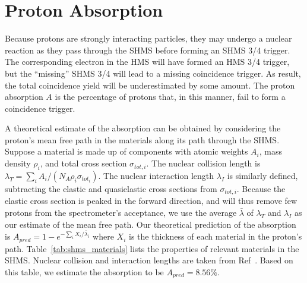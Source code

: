 \section{Proton Absorption}

Because protons are strongly interacting particles, they may undergo a nuclear
reaction as they pass through the SHMS before forming an SHMS 3/4 trigger.
The corresponding electron in the HMS will have formed an HMS 3/4 trigger, but
the ``missing'' SHMS 3/4 will lead to a missing coincidence trigger.
As result, the total coincidence yield will be underestimated by some amount.
The proton absorption $A$ is the percentage of protons that, in this manner,
fail to form a coincidence trigger.


A theoretical estimate of the absorption can be obtained by considering the
proton's mean free path in the materials along its path through the SHMS.
Suppose a material is made up of components with atomic weights $A_i$, mass
density $\rho_i$, and total cross section $\sigma_{tot,i}$.
The nuclear collision length is
$\lambda_{T} = \sum_i A_i / (N_A \rho_i \sigma_{tot_i})$.
The nuclear interaction length $\lambda_{I}$ is similarly defined, subtracting
the elastic and quasielastic cross sections from $\sigma_{tot,i}$.
Because the elastic cross section is peaked in the forward direction, and will
thus remove few protons from the spectrometer's acceptance, we use the average
$\bar\lambda$ of $\lambda_T$ and $\lambda_I$ as our estimate of the mean free
path.
Our theoretical prediction of the absorption is
$A_{pred}=1-e^{-\sum_i X_i/\bar\lambda_i}$ where
$X_i$ is the thickness of each material in the proton's path.
Table~\ref{tab:shms_materials} lists the properties of relevant materials in
the SHMS.
Nuclear collision and interaction lengths are taken from
Ref~\cite{pdg_material_properties}.
Based on this table, we estimate the absorption to be $A_{pred}=8.56\%$.


